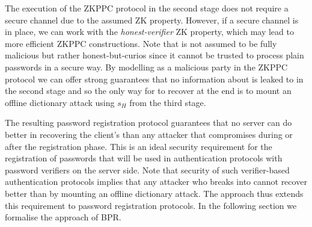 The execution of the \ac{ZKPPC} protocol in the second stage does not require a secure channel due to the assumed \ac{ZK} property. 
However, if a secure channel is in place, we can work with the \emph{honest-verifier} \ac{ZK} property, which may lead to more efficient \ac{ZKPPC} constructions. 
Note that \Server is not assumed to be fully malicious but rather honest-but-curios since it cannot be trusted to process plain passwords in a secure way. 
By modelling \Server as a malicious party in the \ac{ZKPPC} protocol we can offer strong guarantees that no information about \pwd is leaked to \Server in the second stage and so the only way for \Server to recover \pwd at the end is to mount an offline dictionary attack using $s_H$ from the third stage.

The resulting password registration protocol guarantees that no server \Server can do better in recovering the client's \pwd than any attacker \cA that compromises \Server during or after the registration phase. 
This is an ideal security requirement for the registration of passwords that will be used in authentication protocols with password verifiers on the server side. 
Note that security of such verifier-based authentication protocols implies that any attacker \cA who breaks into \Server cannot recover \pwd better than by mounting an offline dictionary attack. 
The approach thus extends this requirement to password registration protocols.
In the following section we formalise the approach of \acl{BPR}.

